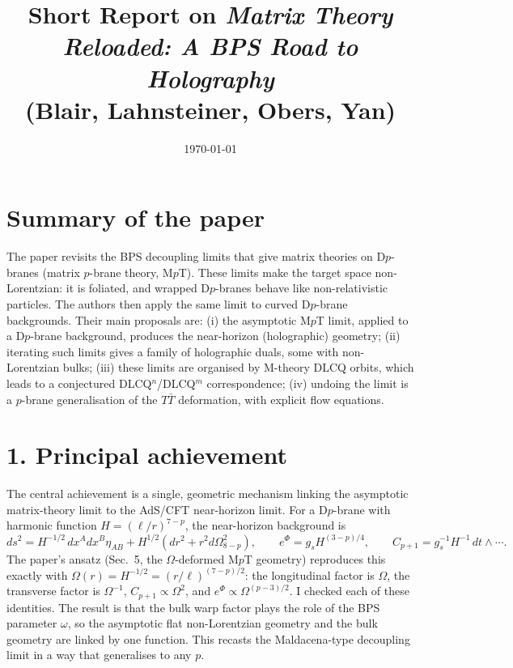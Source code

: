 \documentclass[11pt]{article}
\title{Short Report on \emph{Matrix Theory Reloaded: A BPS Road to Holography}\\[0.3em]
\large (Blair, Lahnsteiner, Obers, Yan)}
\author{}
\date{\today}
\begin{document}
\maketitle

\section*{Summary of the paper}

The paper revisits the BPS decoupling limits that give matrix theories on D$p$-branes (matrix $p$-brane theory, M$p$T). These limits make the target space non-Lorentzian: it is foliated, and wrapped D$p$-branes behave like non-relativistic particles. The authors then apply the same limit to curved D$p$-brane backgrounds. Their main proposals are:
(i) the asymptotic M$p$T limit, applied to a D$p$-brane background, produces the near-horizon (holographic) geometry;
(ii) iterating such limits gives a family of holographic duals, some with non-Lorentzian bulks;
(iii) these limits are organised by M-theory DLCQ orbits, which leads to a conjectured DLCQ$^n$/DLCQ$^m$ correspondence;
(iv) undoing the limit is a $p$-brane generalisation of the $T\bar T$ deformation, with explicit flow equations.

\section*{1. Principal achievement}

The central achievement is a single, geometric mechanism linking the asymptotic matrix-theory limit to the AdS/CFT near-horizon limit. For a D$p$-brane with harmonic function $H=(\ell/r)^{7-p}$, the near-horizon background is
\[
ds^2 = H^{-1/2}\,dx^A dx^B\eta_{AB} + H^{1/2}(dr^2+r^2d\Omega^2_{8-p}),\qquad e^{\Phi}=g_s H^{(3-p)/4},\qquad C_{p+1}=g_s^{-1}H^{-1}\,dt\wedge\cdots .
\]
The paper's ansatz (Sec.~5, the $\Omega$-deformed M$p$T geometry) reproduces this exactly with $\Omega(r)=H^{-1/2}=(r/\ell)^{(7-p)/2}$: the longitudinal factor is $\Omega$, the transverse factor is $\Omega^{-1}$, $C_{p+1}\propto\Omega^2$, and $e^\Phi\propto\Omega^{(p-3)/2}$. I checked each of these identities. The result is that the bulk warp factor plays the role of the BPS parameter $\omega$, so the asymptotic flat non-Lorentzian geometry and the bulk geometry are linked by one function. This recasts the Maldacena-type decoupling limit in a way that generalises to any $p$.
\end{document}
